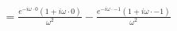 \documentclass[preview]{standalone}
\begin{document}
\begin{align*}
&=\frac{e^{-i\omega\cdot 0}(1+i\omega\cdot 0)}{\omega^{2}}-\frac{e^{-i\omega\cdot -1}(1+i\omega\cdot -1)}{\omega^{2}} \\
\end{align*}
\end{document}
